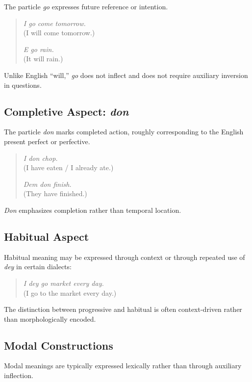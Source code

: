 \documentclass[12pt]{article}
\begin{document}
The particle \textit{go} expresses future reference or intention.

\begin{quote}
\textit{I go come tomorrow.} \\
(I will come tomorrow.)

\textit{E go rain.} \\
(It will rain.)
\end{quote}

Unlike English “will,” \textit{go} does not inflect and does not require auxiliary inversion in questions.

\subsection{Completive Aspect: \textit{don}}

The particle \textit{don} marks completed action, roughly corresponding to the English present perfect or perfective.

\begin{quote}
\textit{I don chop.} \\
(I have eaten / I already ate.)

\textit{Dem don finish.} \\
(They have finished.)
\end{quote}

\textit{Don} emphasizes completion rather than temporal location.

\subsection{Habitual Aspect}

Habitual meaning may be expressed through context or through repeated use of \textit{dey} in certain dialects:

\begin{quote}
\textit{I dey go market every day.} \\
(I go to the market every day.)
\end{quote}

The distinction between progressive and habitual is often context-driven rather than morphologically encoded.

\subsection{Modal Constructions}

Modal meanings are typically expressed lexically rather than through auxiliary inflection.
\end{document}
